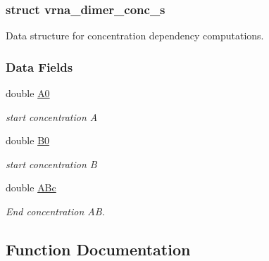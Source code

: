 \subsubsection{struct vrna\+\_\+dimer\+\_\+conc\+\_\+s}
Data structure for concentration dependency computations. \subsubsection*{Data Fields}
\begin{DoxyCompactItemize}
\item 
double \hyperlink{group__pf__cofold_a9722115f1a483583beaf7ef0f8180087}{A0}\hypertarget{group__pf__cofold_a9722115f1a483583beaf7ef0f8180087}{}\label{group__pf__cofold_a9722115f1a483583beaf7ef0f8180087}

\begin{DoxyCompactList}\small\item\em start concentration A \end{DoxyCompactList}\item 
double \hyperlink{group__pf__cofold_a5231715f610413dd5a88bc9f958cf5f3}{B0}\hypertarget{group__pf__cofold_a5231715f610413dd5a88bc9f958cf5f3}{}\label{group__pf__cofold_a5231715f610413dd5a88bc9f958cf5f3}

\begin{DoxyCompactList}\small\item\em start concentration B \end{DoxyCompactList}\item 
double \hyperlink{group__pf__cofold_aef56a1fe8d7f07e7b5d9a65417dda8a4}{A\+Bc}\hypertarget{group__pf__cofold_aef56a1fe8d7f07e7b5d9a65417dda8a4}{}\label{group__pf__cofold_aef56a1fe8d7f07e7b5d9a65417dda8a4}

\begin{DoxyCompactList}\small\item\em End concentration AB. \end{DoxyCompactList}\end{DoxyCompactItemize}


\subsection{Function Documentation}
